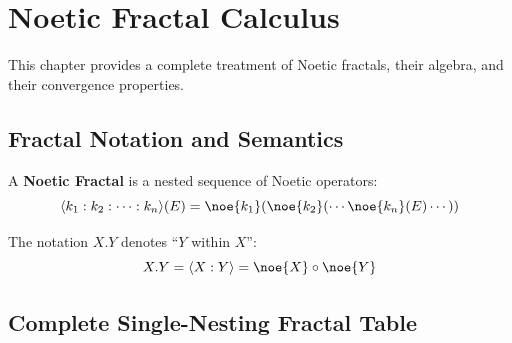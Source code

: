 \chapter{Noetic Fractal Calculus}
\label{ch:fractal-calculus}

This chapter provides a complete treatment of Noetic fractals, their algebra, and their convergence properties.

\section{Fractal Notation and Semantics}

\begin{definition}
\label{def:noetic-fractal}
A \textbf{Noetic Fractal} is a nested sequence of Noetic operators:
\[
\langle k_1 : k_2 : \cdots : k_n \rangle(E) = \noe{k_1}(\noe{k_2}(\cdots\noe{k_n}(E)\cdots))
\]
\end{definition}

\begin{definition}
\label{def:single-nest}
The notation $X.Y$ denotes ``$Y$ within $X$'':
\[
X.Y = \langle X : Y \rangle = \noe{X} \circ \noe{Y}
\]
\end{definition}

\section{Complete Single-Nesting Fractal Table}

